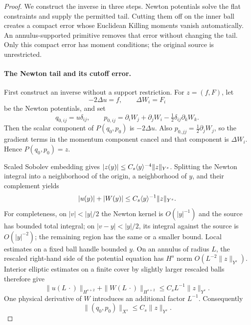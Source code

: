 \begin{proof}
We construct the inverse in three steps. Newton potentials solve the
flat constraints and supply the permitted tail. Cutting them off on the
inner ball creates a compact error whose Euclidean Killing moments
vanish automatically. An annulus-supported primitive removes that error
without changing the tail. Only this compact error has moment
conditions; the original source is unrestricted.

\paragraph{The Newton tail and its cutoff error.}
First construct an inverse without a support restriction. For
\(z=(f,F)\), let
\[
 -2\Delta u=f,\qquad \Delta W_i=F_i
\]
be the Newton potentials, and set
\begin{equation}
 q_{0,ij}=u\delta_{ij},\qquad
 p_{0,ij}=\partial_iW_j+\partial_jW_i
                 -\tfrac12\delta_{ij}\partial_kW_k.
 \label{pk:constraint-Newton}
\end{equation}
Then the scalar component of \(P(q_0,p_0)\) is \(-2\Delta u\).
Also \(p_{0,jj}=\tfrac12\partial_jW_j\), so the gradient terms in the
momentum component cancel and that component is \(\Delta W_i\).
Hence \(P(q_0,p_0)=z\).

Scaled Sobolev embedding gives
\(|z(y)|\leq C_s\langle y\rangle^{-4}\|z\|_{Y^s}\).  Splitting the Newton
integral into a neighborhood of the origin, a neighborhood of \(y\),
and their complement yields
\[
 |u(y)|+|W(y)|\leq C_s\langle y\rangle^{-1}\|z\|_{Y^s}.
\]
For completeness, on \(|v|<|y|/2\) the Newton kernel is \(O(|y|^{-1})\)
and the source has bounded total integral; on
\(|v-y|<|y|/2\), its integral against the source is \(O(|y|^{-2})\);
the remaining region has the same or a smaller bound.  Local estimates
on a fixed ball handle bounded \(y\).
On an annulus of radius \(L\), the rescaled right-hand side of the
potential equation has \(H^s\) norm \(O(L^{-2}\|z\|_{Y^s})\).
Interior elliptic estimates on a finite cover by slightly larger
rescaled balls therefore give
\[
 \|u(L\,\cdot)\|_{H^{s+2}}
       +\|W(L\,\cdot)\|_{H^{s+2}}
       \leq C_sL^{-1}\|z\|_{Y^s}.
\]
One physical derivative of \(W\) introduces an additional factor
\(L^{-1}\).  Consequently
\begin{equation}
 \|(q_0,p_0)\|_{X^s}\leq C_s\|z\|_{Y^s}.
 \label{pk:constraint-Newton-bound}
\end{equation}


\end{proof}
